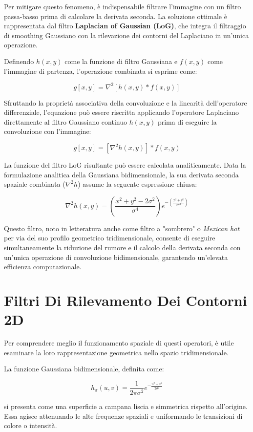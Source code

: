 ﻿\documentclass[11pt, a4paper]{article}
\begin{document}
Per mitigare questo fenomeno, è indispensabile filtrare l'immagine con un filtro passa-basso prima di calcolare la derivata seconda. La soluzione ottimale è rappresentata dal filtro \textbf{Laplacian of Gaussian (LoG)}, che integra il filtraggio di smoothing Gaussiano con la rilevazione dei contorni del Laplaciano in un'unica operazione.

Definendo $h(x,y)$ come la funzione di filtro Gaussiana e $f(x,y)$ come l'immagine di partenza, l'operazione combinata si esprime come:

\[ g[x, y] = \nabla^2 [h(x,y) * f(x,y)] \]

Sfruttando la proprietà associativa della convoluzione e la linearità dell'operatore differenziale, l'equazione può essere riscritta applicando l'operatore Laplaciano direttamente al filtro Gaussiano continuo $h(x,y)$ prima di eseguire la convoluzione con l'immagine:

\[ g[x, y] = [\nabla^2 h(x,y)] * f(x,y) \]

La funzione del filtro LoG risultante può essere calcolata analiticamente. Data la formulazione analitica della Gaussiana bidimensionale, la sua derivata seconda spaziale combinata ($\nabla^2 h$) assume la seguente espressione chiusa:

\[ \nabla^2 h(x, y) = \boxed{\left( \frac{x^2 + y^2 - 2\sigma^2}{\sigma^4} \right) e^{-\left(\frac{x^2 + y^2}{2\sigma^2}\right)}} \]

Questo filtro, noto in letteratura anche come filtro a "sombrero" o \emph{Mexican hat} per via del suo profilo geometrico tridimensionale, consente di eseguire simultaneamente la riduzione del rumore e il calcolo della derivata seconda con un'unica operazione di convoluzione bidimensionale, garantendo un'elevata efficienza computazionale.

\newpage

\section{Filtri Di Rilevamento Dei Contorni 2D}

Per comprendere meglio il funzionamento spaziale di questi operatori, è utile esaminare la loro rappresentazione geometrica nello spazio tridimensionale.

La funzione Gaussiana bidimensionale, definita come:

\[ h_\sigma(u, v) = \frac{1}{2\pi\sigma^2} e^{-\frac{u^2+v^2}{2\sigma^2}} \]

si presenta come una superficie a campana liscia e simmetrica rispetto all'origine. Essa agisce attenuando le alte frequenze spaziali e uniformando le transizioni di colore o intensità.
\end{document}
